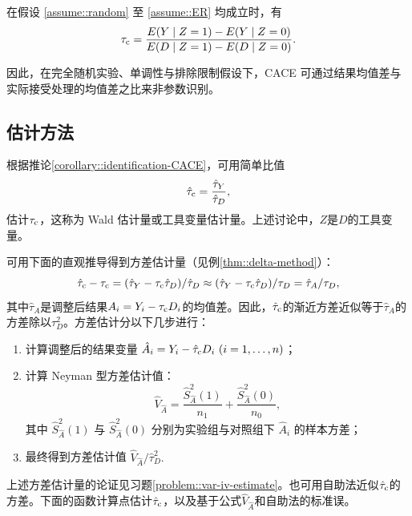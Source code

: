 \begin{corollary}
\label{corollary::identification-CACE}
在假设 \ref{assume::random} 至 \ref{assume::ER} 均成立时，有
$$
\tau_{\textup{c}} = \frac{ E(Y\mid Z=1) - E(Y\mid Z=0) }{ E(D\mid Z=1) - E(D \mid Z=0) } .
$$
\end{corollary}


因此，在完全随机实验、单调性与排除限制假设下，CACE 可通过结果均值差与实际接受处理的均值差之比来非参数识别。



\subsection{估计方法}
\label{sec::estimation-IV}


根据推论\ref{corollary::identification-CACE}，可用简单比值
$$
\hat{\tau}_{\textup{c}}  = \frac{  \hat{\tau}_Y }{  \hat{\tau}_D  } ,
$$
估计$\tau_{\textup{c}}$，这称为 Wald 估计量\citep{wald1940fitting}或工具变量估计量。上述讨论中，$Z$是$D$的工具变量。   



可用下面的直观推导得到方差估计量（见例\ref{thm::delta-method}）：
$$
\hat{\tau}_{\textup{c}} - \tau_{\textup{c}}  = ( \hat{\tau}_Y  -  \tau_{\textup{c}}\hat{\tau}_D)/\hat{\tau}_D 
\approx  ( \hat{\tau}_Y  -  \tau_{\textup{c}}\hat{\tau}_D)/ \tau_D 
= \hat{\tau}_A / \tau_D ,
$$
其中$\hat{\tau}_A$是调整后结果$A_i = Y_i -  \tau_{\textup{c}} D_i$的均值差。因此，$\hat{\tau}_{\textup{c}}$的渐近方差近似等于$\hat{\tau}_A$的方差除以$\tau_D^2$。方差估计分以下几步进行： 
\begin{enumerate}
\item
计算调整后的结果变量 $\hat{A}_i =  Y_i -  \hat{\tau}_{\textup{c}} D_i\ (i=1, \ldots, n)$；

\item
计算 Neyman 型方差估计值：
$$
\hat{V}_{\hat{A}} = \frac{\hat{S}_{\hat{A}}^2(1)}{n_1} + \frac{\hat{S}_{\hat{A}}^2(0)}{n_0},
$$
其中 $\hat{S}_{\hat{A}}^2(1)$ 与 $\hat{S}_{\hat{A}}^2(0)$ 分别为实验组与对照组下 $\hat{A}_i $ 的样本方差； 

\item
最终得到方差估计值 $ \hat{V}_{\hat{A}} /  \hat{\tau}_D ^2 .$ 
\end{enumerate}


上述方差估计量的论证见习题\ref{problem::var-iv-estimate}。也可用自助法近似$\hat{\tau}_{\textup{c}} $的方差。下面的函数计算点估计$\hat{\tau}_{\textup{c}} $，以及基于公式$\hat{V}_{\hat{A}} $和自助法的标准误。 

